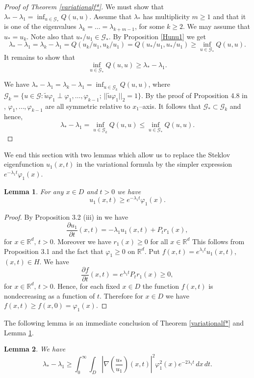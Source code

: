 \documentclass[11pt,leqno]{article}
\newtheorem{lem}{Lemma}[section]
\theoremstyle{definition}
\newcommand{\Rd}{\mathbb{R}^d}
\numberwithin{equation}{section}
\begin{document}
\begin{proof}[Proof of Theorem \ref{variationalf*}]
We must show that $\lambda_* - \lambda_1 = \inf_{u \in \mathcal{G}_*} Q(u,u)$. 
Assume that $\lambda_*$ has multiplicity $m \ge 1$ and that it is one of the
eigenvalues
$\lambda_k = \ldots = \lambda_{k + m -1}$, for some $k \ge 2$.  
We may  assume that $u_*
= u_k$.  Note also that $u_*/u_1 \in \mathcal{G}_*$. By Proposition \ref{Hunu1} we get 
$$
\lambda_* - \lambda_1 = \lambda_k - \lambda_1 = Q(u_k/u_1, u_k/u_1)
= Q(u_*/u_1, u_*/u_1) \ge \inf_{u \in \mathcal{G}_*} Q(u,u).
$$
It remains to show that 
$$ \inf_{u \in \mathcal{G}_*} Q(u,u) \ge \lambda_* - \lambda_1.$$

We have 
$\lambda_* - \lambda_1 = \lambda_k - \lambda_1 = 
\inf_{u \in \mathcal{G}_k} Q(u,u)$, where $\mathcal{G}_k = \{u \in \mathcal{G}:
\tilde{u}\varphi_1 \perp \varphi_1, \ldots, \varphi_{k - 1}; \, ||\tilde{u}\varphi_1||_2 = 1 \}$.
By the proof of Proposition 4.8 in \cite{BK}, $\varphi_1, \ldots, \varphi_{k - 1}$ are all
symmetric relative to $x_1$--axis. It follows that $\mathcal{G}_* \subset \mathcal{G}_k$ and
hence, 
$$
\lambda_* - \lambda_1 = \inf_{u \in \mathcal{G}_k} Q(u,u) \le \inf_{u \in \mathcal{G}_*} Q(u,u).
$$ 
\end{proof}

We end this section with   two lemmas which allow us to replace the
Steklov eigenfunction
$u_1(x,t)$ in the variational formula by the simpler expression 
$e^{- \lambda_1 t} \varphi_1(x)$.


\begin{lem}
\label{r1}
For any $x \in D$ and $t > 0$ we have
$$
u_1(x,t) \ge e^{- \lambda_{1} t} \varphi_{1}(x).
$$
\end{lem}
\begin{proof}
By Proposition 3.2 (iii) in \cite{BK} we have
$$
\frac{\partial
u_{1}}{\partial t} (x,t) = -\lambda_{1} u_{1}(x,t)+
P_{t}r_{1}(x),
$$
for $ x \in \Rd, \, t >0$. Moreover we have $r_{1}(x) \ge 0$ for all $x \in \Rd$ 
This follows from Proposition 3.1 \cite{BK} and the fact that $\varphi_1 \ge 0$ on $\Rd$. Put $f(x,t) = e^{ \lambda_{1} t} 
u_{1}(x,t) $, $(x,t) \in H$. We have
$$
\frac{\partial f}{\partial t} (x,t) =  e^{ \lambda_{1} t} P_{t}r_{1}(x) \ge 0,
$$
for $ x \in \Rd, \, t >0$. Hence, for each fixed $x \in D$ the function $f(x,t)$ 
is nondecreasing as a function of $t$. Therefore for $x \in D$ we have  $f(x,t) 
\ge f(x,0) = \varphi_{1}(x)$.
\end{proof}


The following lemma is  an immediate conclusion of Theorem \ref{variationalf*} and Lemma
\ref{r1}. 
\begin{lem}
\label{D01}
We have
$$
\lambda_{*} - \lambda_{1} \ge 
  \int_{0}^{\infty} 
\int_{D} \left| \nabla \left( \frac{u_{*}}{u_{1}} \right)(x,t) \right|^{2} 
\varphi_{1}^{2}(x) e^{-2 \lambda_1 t} \, dx \, dt.
$$
\end{lem}
\end{document}
